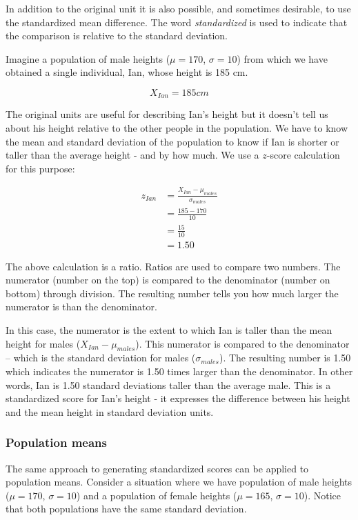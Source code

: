 \documentclass[
]{krantz}
\begin{document}
In addition to the original unit it is also possible, and sometimes desirable, to use the standardized mean difference. The word \emph{standardized} is used to indicate that the comparison is relative to the standard deviation.

Imagine a population of male heights (\(\mu = 170\), \(\sigma = 10\)) from which we have obtained a single individual, Ian, whose height is 185 cm.

\[
X_{Ian} = 185cm
\]

The original units are useful for describing Ian's height but it doesn't tell us about his height relative to the other people in the population. We have to know the mean and standard deviation of the population to know if Ian is shorter or taller than the average height - and by how much. We use a \(z\)-score calculation for this purpose:

\[
\begin{aligned} 
z_{Ian} &=  \frac{X_{Ian} - \mu_{males}}{\sigma_{males}}\\ 
&=  \frac{185 - 170}{10}\\
&=  \frac{15}{10}\\
&= 1.50
\end{aligned} 
\]

The above calculation is a ratio. Ratios are used to compare two numbers. The numerator (number on the top) is compared to the denominator (number on bottom) through division. The resulting number tells you how much larger the numerator is than the denominator.

In this case, the numerator is the extent to which Ian is taller than the mean height for males (\(X_{Ian} - \mu_{males}\)). This numerator is compared to the denominator -- which is the standard deviation for males (\(\sigma_{males}\)). The resulting number is 1.50 which indicates the numerator is 1.50 times larger than the denominator. In other words, Ian is 1.50 standard deviations taller than the average male. This is a standardized score for Ian's height - it expresses the difference between his height and the mean height in standard deviation units.

\hypertarget{population-means}{%
\subsubsection{Population means}\label{population-means}}

The same approach to generating standardized scores can be applied to population means. Consider a situation where we have population of male heights (\(\mu = 170\), \(\sigma = 10\)) and a population of female heights (\(\mu = 165\), \(\sigma = 10\)). Notice that both populations have the same standard deviation.
\end{document}
